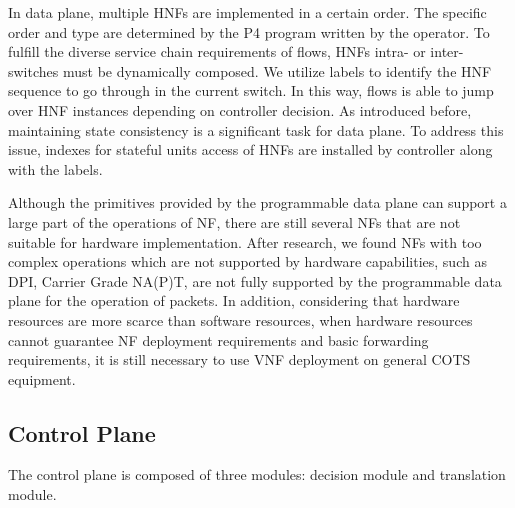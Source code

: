 \documentclass[10pt, conference, letterpaper]{IEEEtran}
\begin{document}
In data plane, multiple HNFs are implemented in a certain order. The specific order and type are determined by the P4 program written by the operator.
To fulfill the diverse service chain requirements of flows, HNFs intra- or inter-switches must be dynamically composed. We utilize labels to identify the HNF sequence to go through in the current switch. In this way, flows is able to jump over HNF instances depending on controller decision.
As introduced before, maintaining state consistency is a significant task for data plane. To address this issue, indexes for stateful units access of HNFs are installed by controller along with the labels.

Although the primitives provided by the programmable data plane can support a large part of the operations of NF, there are still several NFs that are not suitable for hardware implementation. After research, we found NFs with too complex operations which are not supported by hardware capabilities, such as DPI, Carrier Grade NA(P)T, are not fully supported by the programmable data plane for the operation of packets. 
In addition, considering that hardware resources are more scarce than software resources, when hardware resources cannot guarantee NF deployment requirements and basic forwarding requirements, it is still necessary to use VNF deployment on general COTS equipment.

%


\subsection{Control Plane}\label{BB}
The control plane is composed of three modules: decision module and translation module.
\end{document}
